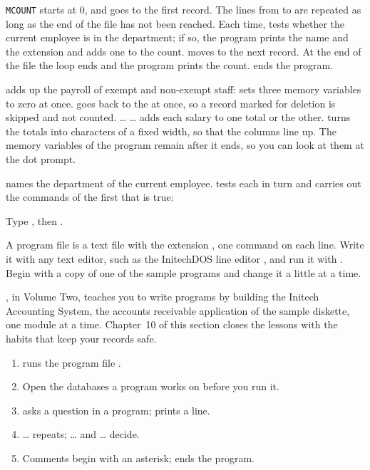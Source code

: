 \texttt{MCOUNT} starts at 0, and  goes to the first record.  The
lines from  to  are repeated as long as the end of the
file has not been reached.  Each time,  tests whether the current
employee is in the department; if so, the program prints the name and the
extension and adds one to the count.   moves to the next record.  At
the end of the file the loop ends and the program prints the count.
 ends the program.

 adds up the payroll of exempt and non-exempt staff:
 sets three memory variables to zero at once.   goes back
to the  at once, so a record marked for deletion is skipped and
not counted.   \ldots{}  \ldots{}  adds each
salary to one total or the other.   turns the totals into characters
of a fixed width, so that the columns line up.  The memory variables of the
program remain after it ends, so you can look at them at the dot prompt.

 names the department of the current employee.  
tests each  in turn and carries out the commands of the first that
is true:
\begin{Steps}[resume]
\item Type , then .
\end{Steps}

A program file is a text file with the extension , one command on
each line.  Write it with any text editor, such as the InitechDOS line editor
, and run it with .  Begin with a copy of one of the sample
programs and change it a little at a time.

, in Volume Two, teaches you to write
programs by building the Initech Accounting System, the accounts receivable
application of the sample diskette, one module at a time.  Chapter~10 of this
section closes the lessons with the habits that keep your records safe.

\begin{enumerate}
\item {}  runs the program file .
\item Open the databases a program works on before you run it.
\item {} asks a question in a program;  prints a line.
\item {} \ldots{}  repeats;  \ldots{}
   and  \ldots{}  decide.
\item Comments begin with an asterisk;  ends the program.
\end{enumerate}
